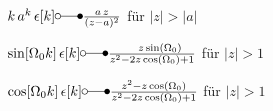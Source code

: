 \documentclass[11pt,a4paper,DIV=12]{scrartcl}
\begin{document}
\noindent $k \, a^k \, \epsilon[k] \laplace \frac{a \, z}{(z-a)^2}$  für $|z| > |a|$

\noindent $\sin[\Omega_0 k] \, \epsilon[k] \laplace \frac{\quad\, z\sin(\Omega_0)}{z^2 -2z \cos(\Omega_0) +1}$ für $|z| > 1$

\noindent $\cos[\Omega_0 k] \, \epsilon[k] \laplace \frac{z^2-z\cos(\Omega_0)}{z^2 -2z \cos(\Omega_0) +1}$ für $|z| > 1$



%
%
%
\renewcommand{\refname}{Buchzitate}
\clearpage

\end{document}
